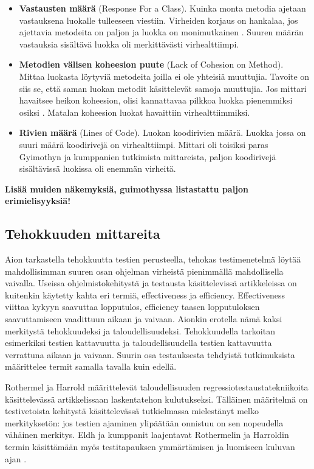\documentclass[finnish]{tktltiki2}
\theoremstyle{definition}
\theoremstyle{remark}
\begin{document}
\begin{itemize}
  \item \textbf{Vastausten määrä} (Response For a Class). Kuinka monta metodia ajetaan vastauksena luokalle tulleeseen viestiin. Virheiden korjaus on hankalaa, jos ajettavia metodeita on paljon ja luokka on monimutkainen \cite{Chidamber94}. Suuren määrän vastauksia sisältävä luokka oli merkittävästi virhealttiimpi. \cite{Gyimothy05}

  \item \textbf{Metodien välisen koheesion puute} (Lack of Cohesion on Method). Mittaa luokasta löytyviä metodeita joilla ei ole yhteisiä muuttujia. Tavoite on siis se, että saman luokan metodit käsittelevät samoja muuttujia. Jos mittari havaitsee heikon koheesion, olisi kannattavaa pilkkoa luokka pienemmiksi osiksi \cite{Chidamber94}. Matalan koheesion luokat havaittiin virhealttiimmiksi. \cite{Gyimothy05}

  \item \textbf{Rivien määrä} (Lines of Code). Luokan koodirivien määrä.  Luokka jossa on suuri määrä koodirivejä on virhealttiimpi. Mittari oli toisiksi paras Gyimothyn ja kumppanien tutkimista mittareista, paljon koodirivejä sisältävissä luokissa oli enemmän virheitä. \cite{Gyimothy05}


\end{itemize}

\textbf{Lisää muiden näkemyksiä, guimothyssa listastattu paljon erimielisyyksiä! \cite{Gyimothy05}}




\subsection{Tehokkuuden mittareita}

Aion tarkastella tehokkuutta testien perusteella, tehokas testimenetelmä löytää mahdollisimman suuren osan ohjelman virheistä pienimmällä mahdollisella vaivalla. Useissa ohjelmistokehitystä ja testausta käsittelevissä artikkeleissa on kuitenkin käytetty kahta eri termiä, effectiveness ja efficiency.  Effectiveness viittaa kykyyn saavuttaa lopputulos, efficiency taasen lopputuloksen saavuttamiseen vaadittuun aikaan ja vaivaan. Aionkin erotella nämä kaksi merkitystä tehokkuudeksi ja taloudellisuudeksi. Tehokkuudella tarkoitan esimerkiksi testien kattavuutta ja taloudellisuudella testien kattavuutta verrattuna aikaan ja vaivaan. Suurin osa testauksesta tehdyistä tutkimuksista määrittelee termit samalla tavalla kuin edellä. \cite{Juristo06}

Rothermel ja Harrold määrittelevät taloudellisuuden regressiotestaustatekniikoita käsittelevässä artikkelissaan \cite{Rothermel96} laskentatehon kulutukseksi. Tälläinen määritelmä on testivetoista kehitystä käsittelevässä tutkielmassa mielestänyt melko merkityksetön: jos testien ajaminen ylipäätään onnistuu on sen nopeudella vähäinen merkitys. Eldh ja kumppanit laajentavat Rothermelin ja Harroldin termin käsittämään myös testitapauksen ymmärtämisen ja luomiseen kuluvan ajan \cite{Eldh06}.
\end{document}
